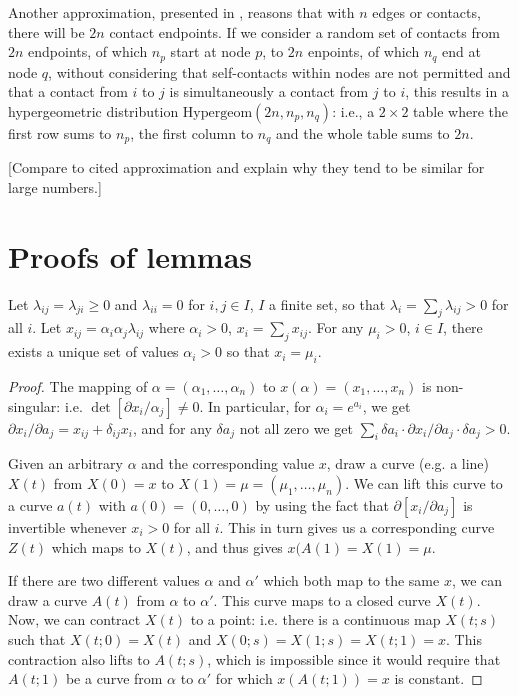 \documentclass{myaptpub}%
\newcommand\NB[1]{{\color{red}[#1]}}
\begin{document}
Another approximation, presented in \cite{Li2010a}, reasons that with $n$ edges or contacts, there will be $2n$ contact endpoints. If we consider a random set of contacts from $2n$ endpoints, of which $n_p$ start at node $p$, to $2n$ enpoints, of which $n_q$ end at node $q$, without considering that self-contacts within nodes are not permitted and that a contact from $i$ to $j$ is simultaneously a contact from $j$ to $i$, this results in a hypergeometric distribution $\textrm{Hypergeom}(2n,n_p,n_q)$: i.e., a $2\times2$ table where the first row sums to $n_p$, the first column to $n_q$ and the whole table sums to $2n$.

\NB{Compare to cited approximation and explain why they tend to be similar for large numbers.}


\appendix

\section{Proofs of lemmas}

\begin{lemma}\label{lemma:aSolve}
Let $\lambda_{ij}=\lambda_{ji}\ge0$ and $\lambda_{ii}=0$ for $i,j\in I$, $I$ a finite set, so that $\lambda_i=\sum_j\lambda_{ij}>0$ for all $i$. Let $x_{ij}=\alpha_{i}\alpha_{j}\lambda_{ij}$ where $\alpha_i>0$, $x_{i}=\sum_j x_{ij}$. For any $\mu_i>0$, $i\in I$, there exists a unique set of values $\alpha_i>0$ so that $x_{i}=\mu_{i}$.
\end{lemma}

\begin{proof}
\newcommand\REAL{\boldmath{R}}
The mapping of $\alpha=(\alpha_1,\ldots,\alpha_n)$ to $x(\alpha)=(x_1,\ldots,x_n)$ is non-singular: i.e. $\det[\partial x_i/\alpha_j]\not=0$. In particular, for $\alpha_i=e^{a_i}$, we get $\partial x_i/\partial a_j=x_{ij}+\delta_{ij}x_i$, and for any $\delta a_j$ not all zero we get $\sum_i\delta a_i\cdot\partial x_i/\partial a_j\cdot\delta a_j>0$.

Given an arbitrary $\alpha$ and the corresponding value $x$, draw a curve (e.g. a line) $X(t)$ from $X(0)=x$ to $X(1)=\mu=(\mu_1,\ldots,\mu_n)$. We can lift this curve to a curve $a(t)$ with $a(0)=(0,\ldots,0)$ by using the fact that $\partial [x_i/\partial a_j]$ is invertible whenever $x_i>0$ for all $i$. This in turn gives us a corresponding curve $Z(t)$ which maps to $X(t)$, and thus gives $x(A(1)=X(1)=\mu$.

If there are two different values $\alpha$ and $\alpha'$ which both map to the same $x$, we can draw a curve $A(t)$ from $\alpha$ to $\alpha'$. This curve maps to a closed curve $X(t)$. Now, we can contract $X(t)$ to a point: i.e. there is a continuous map $X(t;s)$ such that $X(t;0)=X(t)$ and $X(0;s)=X(1;s)=X(t;1)=x$. This contraction also lifts to $A(t;s)$, which is impossible since it would require that $A(t;1)$ be a curve from $\alpha$ to $\alpha'$ for which $x(A(t;1))=x$ is constant.
\end{proof}
\end{document}
